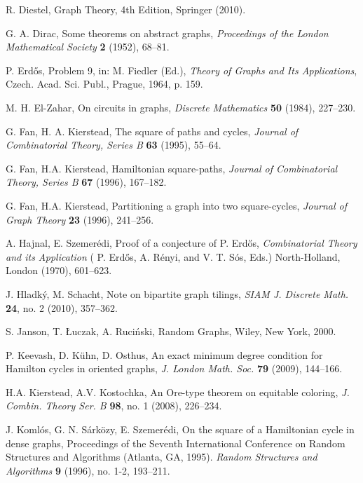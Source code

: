 \documentclass[oneside,12pt]{memoir}
\begin{document}
\begin{thebibliography}{99}
 R. Diestel, Graph Theory, 4th Edition, Springer
(2010).

 G. A. Dirac, Some theorems on abstract graphs, \emph{Proceedings
of the London Mathematical Society} \textbf{2} (1952), 68--81.

 P. Erd\H{o}s, Problem 9, in: M. Fiedler (Ed.), \emph{Theory 
of Graphs and Its Applications}, Czech. Acad. Sci. Publ., Prague, 1964,
p. 159.

 M. H. El-Zahar, On circuits in graphs, \emph{Discrete Mathematics} \textbf{50} (1984), 227--230.

G. Fan, H. A. Kierstead, The square of paths and cycles,
\emph{Journal of Combinatorial Theory, Series B} \textbf{63} (1995), 55--64.

G. Fan, H.A. Kierstead, Hamiltonian square-paths, \emph{Journal 
of Combinatorial Theory, Series B} \textbf{67} (1996), 167--182.


G. Fan, H.A. Kierstead, Partitioning a graph into two
square-cycles, \emph{Journal of Graph Theory} \textbf{23} (1996), 241--256.

 A. Hajnal, E. Szemer\'edi, Proof of a conjecture of P. Erd\H{o}s, \emph{Combinatorial Theory and its Application} ( P. Erd\H{o}s, A. R\'enyi, and V. T. S\'os, Eds.) North-Holland, London (1970), 601--623.

 J. Hladk\'y, M. Schacht, Note on bipartite graph tilings, \emph{SIAM J. Discrete Math.}  \textbf{24}, no. 2 (2010), 357--362.

 S. Janson, T. \L{}uczak, A. Ruci\'{n}ski, Random Graphs,
Wiley, New York, 2000.

 P. Keevash, D. K\"uhn, D. Osthus, An exact minimum degree condition for Hamilton cycles in
oriented graphs, \emph{J. London Math. Soc.} \textbf{79} (2009), 144--166.

 H.A. Kierstead, A.V. Kostochka, An Ore-type theorem on equitable coloring, \emph{J. Combin. Theory Ser. B} \textbf{98},  no. 1 (2008), 226--234.

  J. Koml\'{o}s, G. N. S\'{a}rk\"{o}zy, E. Szemer\'{e}di, On the square of a Hamiltonian cycle in dense graphs, Proceedings of the Seventh
International Conference on Random Structures and Algorithms (Atlanta, GA, 1995). \emph{Random
Structures and Algorithms} \textbf{9} (1996), no. 1-2, 193--211.


\end{thebibliography}
\end{document}
